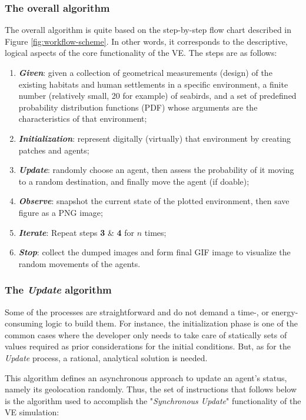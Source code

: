 \subsubsection{The overall algorithm}
The overall algorithm is quite based on the step-by-step flow chart described in Figure \ref{fig:workflow-scheme}. In other words, it corresponds to the descriptive, logical aspects of the core functionality of the VE. The steps are as follows:

\begin{enumerate}
    \item \textbf{\textit{Given}}: given a collection of geometrical measurements (design) of the existing habitats and human settlements in a specific environment, a finite number (relatively small, 20 for example) of seabirds, and a set of predefined probability distribution functions (PDF) whose arguments are the characteristics of that environment;
    \item \textbf{\textit{Initialization}}: represent digitally (virtually) that environment by creating patches and agents;
    \item \textbf{\textit{Update}}: randomly choose an agent, then assess the probability of it moving to a random destination, and finally move the agent (if doable);
    \item \textbf{\textit{Observe}}: snapshot the current state of the plotted environment, then save figure as a PNG image;
    \item \textbf{\textit{Iterate}}: Repeat steps \textbf{3} \& \textbf{4} for $n$ times;
    \item \textbf{\textit{Stop}}: collect the dumped images and form final GIF image to visualize the random movements of the agents.
\end{enumerate}

\subsubsection{The \emph{Update} algorithm}
Some of the processes are straightforward and do not demand a time-, or energy-consuming logic to build them. For instance, the initialization phase is one of the common cases where the developer only needs to take care of statically sets of values required as prior considerations for the initial conditions. But, as for the \emph{Update} process, a rational, analytical solution is needed.

This algorithm defines an asynchronous approach to update an agent's status, namely its geolocation randomly. Thus, the set of instructions that follows below is the algorithm used to accomplish the "\emph{Synchronous Update}" functionality of the VE simulation:

